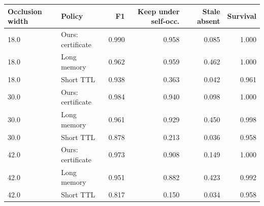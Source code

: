 \begin{tabular}{llrrrr}
\hline
Occlusion width & Policy & F1 & Keep under self-occ. & Stale absent & Survival \\
\hline
18.0 & Ours: certificate & 0.990 & 0.958 & 0.085 & 1.000 \\
18.0 & Long memory & 0.962 & 0.959 & 0.462 & 1.000 \\
18.0 & Short TTL & 0.938 & 0.363 & 0.042 & 0.961 \\
30.0 & Ours: certificate & 0.984 & 0.940 & 0.098 & 1.000 \\
30.0 & Long memory & 0.961 & 0.929 & 0.450 & 0.998 \\
30.0 & Short TTL & 0.878 & 0.213 & 0.036 & 0.958 \\
42.0 & Ours: certificate & 0.973 & 0.908 & 0.149 & 1.000 \\
42.0 & Long memory & 0.951 & 0.882 & 0.423 & 0.992 \\
42.0 & Short TTL & 0.817 & 0.150 & 0.034 & 0.958 \\
\hline
\end{tabular}
